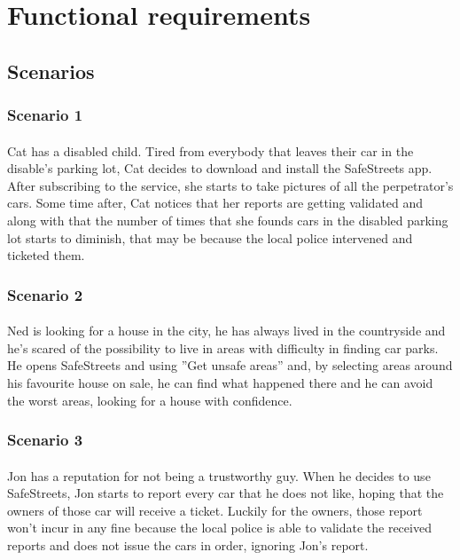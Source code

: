 		\section{Functional requirements}
			\subsection{Scenarios}
				\subsubsection{Scenario 1}
					\paragraph{}
						Cat has a disabled child. Tired from everybody that leaves their car in the disable's parking lot, Cat decides to download and install the SafeStreets app. After subscribing to the service, she starts to take pictures of all the perpetrator's cars. Some time after, Cat notices that her reports are getting validated and along with that the number of times that she founds cars in the disabled parking lot starts to diminish, that may be because the local police intervened and ticketed them.
				\subsubsection{Scenario 2}
					\paragraph{}
						Ned is looking for a house in the city, he has always lived in the countryside and he's scared of the possibility to live in areas with difficulty in finding car parks. He opens SafeStreets and using ''Get unsafe areas'' and, by selecting areas around his favourite house on sale, he can find what happened there and he can avoid the worst areas, looking for a house with confidence.
				\subsubsection{Scenario 3}
					\paragraph{}
						Jon has a reputation for not being a trustworthy guy. When he decides to use SafeStreets, Jon starts to report every car that he does not like, hoping that the owners of those car will receive a ticket. Luckily for the owners, those report won't incur in any fine because the local police is able to validate the received reports and does not issue the cars in order, ignoring Jon's report.
